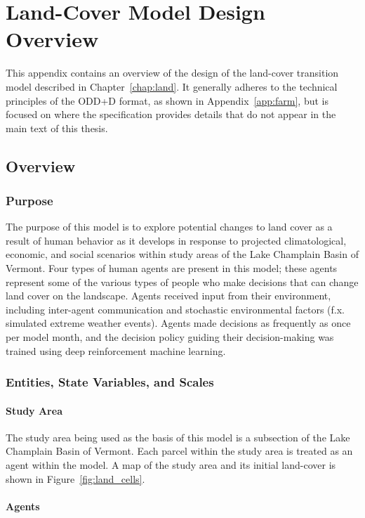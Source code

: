\chapter{Land-Cover Model Design Overview}
\label{app:land}

This appendix contains an overview of the design of the land-cover transition
model described in Chapter~\ref{chap:land}.
It generally adheres to the technical principles of the ODD+D format,
as shown in Appendix~\ref{app:farm},
but is focused on where the specification provides details that do not appear
in the main text of this thesis.

\section{Overview}
\subsection{Purpose}
The purpose of this model is to explore potential changes to land cover as a result of human behavior as it develops in response to projected climatological, economic, and social scenarios within study areas of the Lake Champlain Basin of Vermont.
Four types of human agents are present in this model; these agents represent some of the various types of people who make decisions that can change land cover on the landscape. Agents received input from their environment, including inter-agent communication and stochastic environmental factors (f.x. simulated extreme weather events). Agents made decisions as frequently as once per model month, and the decision policy guiding their decision-making was trained using deep reinforcement machine learning.

\subsection{Entities, State Variables, and Scales}

\subsubsection{Study Area}
The study area being used as the basis of this model is a subsection 
of the Lake Champlain Basin of Vermont. 
Each parcel within the study area is treated as an agent within the model.
A map of the study area and its initial land-cover is
shown in Figure~\ref{fig:land_cells}.

\subsubsection{Agents}

